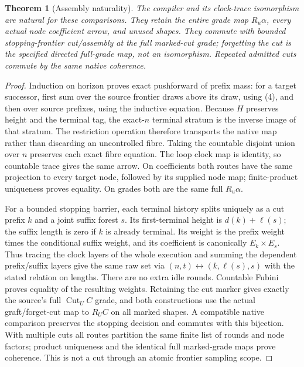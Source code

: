 \documentclass[11pt]{article}
\newtheorem{theorem}{Theorem}\newtheorem{proposition}[theorem]{Proposition}
\begin{document}
\begin{theorem}[Assembly naturality]
The compiler and its clock-trace isomorphism are natural for these comparisons. They retain the entire grade map $R_u\alpha$, every actual node coefficient arrow, and unused shapes. They commute with bounded stopping-frontier cut/assembly at the full marked-cut grade; forgetting the cut is the specified directed full-grade map, not an isomorphism. Repeated admitted cuts commute by the same native coherence.
\end{theorem}
\begin{proof}
Induction on horizon proves exact pushforward of prefix mass: for a target successor, first sum over the source frontier draws above its draw, using (4), and then over source prefixes, using the inductive equation. Because $H$ preserves height and the terminal tag, the exact-$n$ terminal stratum is the inverse image of that stratum. The restriction operation therefore transports the native map rather than discarding an uncontrolled fibre. Taking the countable disjoint union over $n$ preserves each exact fibre equation. The loop clock map is identity, so countable trace gives the same arrow. On coefficients both routes have the same projection to every target node, followed by its supplied node map; finite-product uniqueness proves equality. On grades both are the same full $R_u\alpha$.

For a bounded stopping barrier, each terminal history splits uniquely as a cut prefix $k$ and a joint suffix forest $s$. Its first-terminal height is $d(k)+\ell(s)$; the suffix length is zero if $k$ is already terminal. Its weight is the prefix weight times the conditional suffix weight, and its coefficient is canonically $E_k\times E_s$. Thus tracing the clock layers of the whole execution and summing the dependent prefix/suffix layers give the same raw set via $(n,t)\leftrightarrow(k,\ell(s),s)$ with the stated relation on lengths. There are no extra idle rounds. Countable Fubini proves equality of the resulting weights. Retaining the cut marker gives exactly the source's full $\operatorname{Cut}_UC$ grade, and both constructions use the actual graft/forget-cut map to $R_UC$ on all marked shapes. A compatible native comparison preserves the stopping decision and commutes with this bijection. With multiple cuts all routes partition the same finite list of rounds and node factors; product uniqueness and the identical full marked-grade maps prove coherence. This is not a cut through an atomic frontier sampling scope.
\end{proof}
\end{document}
